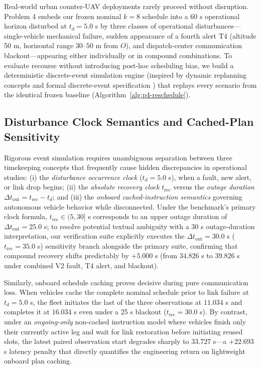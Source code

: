 Real-world urban counter-UAV deployments rarely proceed without disruption. Problem 4 embeds our frozen nominal $k=8$ schedule into a 60 s operational horizon disturbed at $t_d=5.0$ s by three classes of operational disturbances—single-vehicle mechanical failure, sudden appearance of a fourth alert T4 (altitude 50 m, horizontal range $30$--$50$ m from $O$), and dispatch-center communication blackout—appearing either individually or in compound combinations. To evaluate recourse without introducing post-hoc scheduling bias, we build a deterministic discrete-event simulation engine (inspired by dynamic replanning concepts \cite{stentz1994} and formal discrete-event specification \cite{vantendeloo2018}) that replays every scenario from the identical frozen baseline (Algorithm~\ref{alg:p4-reschedule}).

\subsection{Disturbance Clock Semantics and Cached-Plan Sensitivity}
Rigorous event simulation requires unambiguous separation between three timekeeping concepts that frequently cause hidden discrepancies in operational studies: (i) the \emph{disturbance occurrence clock} ($t_d=5.0$ s), when a fault, new alert, or link drop begins; (ii) the \emph{absolute recovery clock} $t_{\mathrm{rec}}$ versus the \emph{outage duration} $\Delta t_{\mathrm{out}}=t_{\mathrm{rec}}-t_d$; and (iii) the \emph{onboard cached-instruction semantics} governing autonomous vehicle behavior while disconnected. Under the benchmark's primary clock formula, $t_{\mathrm{rec}}\in(5,30]$ s corresponds to an upper outage duration of $\Delta t_{\mathrm{out}}=25.0$ s; to resolve potential textual ambiguity with a 30 s outage-duration interpretation, our verification suite explicitly executes the $\Delta t_{\mathrm{out}}=30.0$ s ($t_{\mathrm{rec}}=35.0$ s) sensitivity branch alongside the primary suite, confirming that compound recovery shifts predictably by $+5.000$ s (from $34.826$ s to $39.826$ s under combined V2 fault, T4 alert, and blackout).

Similarly, onboard schedule caching proves decisive during pure communication loss. When vehicles cache the complete nominal schedule prior to link failure at $t_d=5.0$ s, the fleet initiates the last of the three observations at $11.034$ s and completes it at $16.034$ s even under a 25 s blackout ($t_{\mathrm{rec}}=30.0$ s). By contrast, under an \emph{ongoing-only} non-cached instruction model where vehicles finish only their currently active leg and wait for link restoration before initiating reused slots, the latest paired observation start degrades sharply to $33.727$ s—a $+22.693$ s latency penalty that directly quantifies the engineering return on lightweight onboard plan caching.

